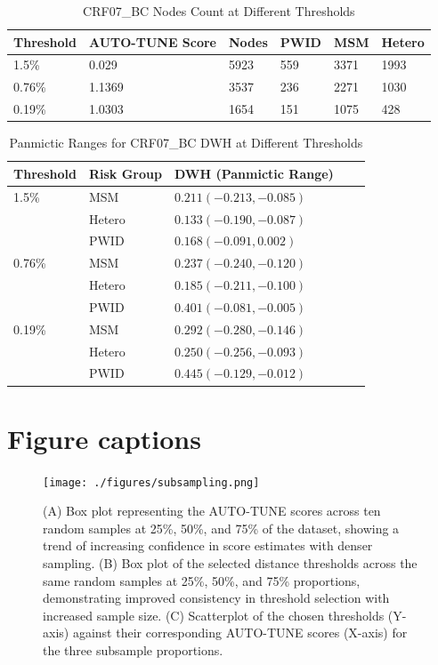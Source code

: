 \documentclass[utf8]{FrontiersinHarvard} %
\begin{document}
\begin{table}[h!]
	\caption{CRF07\_BC Nodes Count at Different Thresholds}
	\label{table:combined}
	\centering
	\begin{tabularx}{\textwidth}{|X|X|X|X|X|X|}
		\hline
		Threshold & AUTO-TUNE Score & Nodes & PWID & MSM  & Hetero \\
		\hline
		1.5\%     & 0.029           & 5923  & 559  & 3371 & 1993   \\
		0.76\%    & 1.1369          & 3537  & 236  & 2271 & 1030   \\
		0.19\%    & 1.0303          & 1654  & 151  & 1075 & 428    \\
		\hline
	\end{tabularx}
\end{table}

\begin{table}[h!]
	\caption{Panmictic Ranges for CRF07\_BC DWH at Different Thresholds}
	\label{table:panmictic}
	\centering
	\begin{tabular}{lllll}
		\hline
		Threshold & Risk Group & DWH   (Panmictic Range)   \\
		\hline
		1.5\%     & MSM        & $0.211  (-0.213, -0.085)$ \\
		          & Hetero     & $0.133 (-0.190, -0.087)$  \\
		          & PWID       & $0.168 (-0.091, 0.002)$   \\
		\hline
		0.76\%    & MSM        & $0.237 (-0.240, -0.120)$  \\
		          & Hetero     & $0.185 (-0.211, -0.100)$  \\
		          & PWID       & $0.401 (-0.081, -0.005)$  \\
		\hline
		0.19\%    & MSM        & $0.292 (-0.280, -0.146)$  \\
		          & Hetero     & $0.250 (-0.256, -0.093)$  \\
		          & PWID       & $0.445 (-0.129, -0.012)$  \\
		\hline
	\end{tabular}
\end{table}


\clearpage

\section{Figure captions}

\begin{figure}[h!]
  \centering
  \texttt{[image: ./figures/subsampling.png]}
	\caption{ (A) Box plot representing the AUTO-TUNE scores across ten random
		samples at 25\%, 50\%, and 75\% of the \citep{rhee_national_2019} dataset,
		showing a trend of increasing confidence in score estimates with denser
		sampling. (B) Box plot of the selected distance thresholds across the same
		random samples at 25\%, 50\%, and 75\% proportions, demonstrating improved
		consistency in threshold selection with increased sample size. (C)
		Scatterplot of the chosen thresholds (Y-axis) against their corresponding
		AUTO-TUNE scores (X-axis) for the three subsample proportions.
	}\label{fig:subsampling}
\end{figure}
\end{document}

